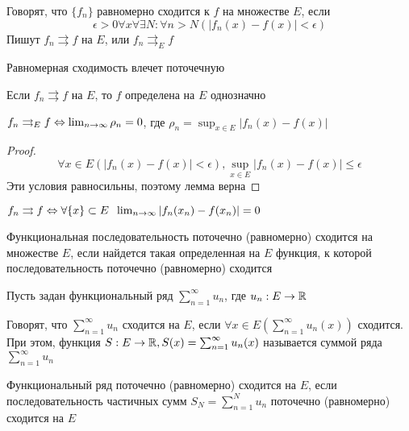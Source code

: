 \begin{definition}
  Говорят, что \(\{f_n\}\) равномерно сходится к \(f\) на множестве \(E\), если 
  \[\epsilon > 0 \forall x \forall  \exists N: \forall n > N (|f_n(x) - f(x)| < \epsilon)\]
  Пишут \(f_n \rightrightarrows f\) на \(E\), или \(f_n \rightrightarrows_E f\)
\end{definition}
\begin{note}
  Равномерная сходимость влечет поточечную
\end{note}
\begin{note}
  Если \(f_n \rightrightarrows f\) на \(E\), то \(f\) определена на \(E\) однозначно
\end{note}

\begin{lemma}
  \(f_n \rightrightarrows_E f \Leftrightarrow \lim_{n \rightarrow \infty}\rho_n = 0\), где \(\rho_n = \sup_{x \in E}|f_n(x) - f(x)|\)  
\end{lemma}
\begin{proof}
  \[\forall x \in E (|f_n(x) - f(x)| < \epsilon), \sup_{x \in E}|f_n(x) - f(x)| \le \epsilon\]
  Эти условия равносильны, поэтому лемма верна
\end{proof}

\begin{problem}
  \(f_n \rightrightarrows f \Leftrightarrow \forall \{x\} \subset E\;\; \lim_{n \rightarrow \infty} |f_n(x_n) - f(x_n)| = 0\)
\end{problem}

\begin{definition}
  Функциональная последовательность поточечно (равномерно) сходится на множестве \(E\), если найдется такая определенная на \(E\) функция, к которой последовательность поточечно (равномерно) сходится
\end{definition}

Пусть задан функциональный ряд \(\sum_{n = 1}^\infty u_n\), где \(u_n: E \rightarrow \mathbb{R}\)
\begin{definition}
  Говорят, что \(\sum_{n = 1}^\infty u_n\) сходится на \(E\), если \(\forall x \in E \left(\sum_{n = 1}^\infty u_n(x)\right)\) сходится. При этом, функция \(S: E \rightarrow \mathbb{R}, S(x) = \sum_{n = 1}^\infty u_n(x)\) называется суммой ряда \(\sum_{n = 1}^\infty u_n\)
\end{definition}

\begin{definition}
  Функциональный ряд поточечно (равномерно) сходится на \(E\), если последовательность частичных сумм \(S_N = \sum_{n = 1}^N u_n\) поточечно (равномерно) сходится на \(E\)
\end{definition}

